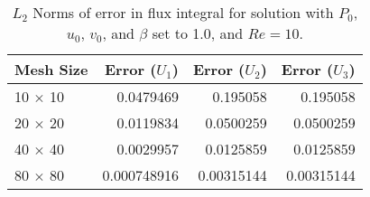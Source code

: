 \begin{table}
\begin{center}
\begin{tabular}{|l | r | r | r |}
\hline
Mesh Size & Error ($U_1$) & Error ($U_2$) & Error ($U_3$) \\
\hline
10 $\times$ 10 & 0.0479469 & 0.195058 & 0.195058 \\
20 $\times$ 20 & 0.0119834 & 0.0500259 & 0.0500259 \\
40 $\times$ 40 & 0.0029957 & 0.0125859 & 0.0125859 \\
80 $\times$ 80 & 0.000748916 & 0.00315144 & 0.00315144 \\
\hline
\end{tabular}
\caption{$L_2$ Norms of error in flux integral for solution with $P_0$, $u_0$, $v_0$, and $\beta$ set to 1.0, and $Re = 10$.}
\label{norm}
\end{center}
\end{table}
